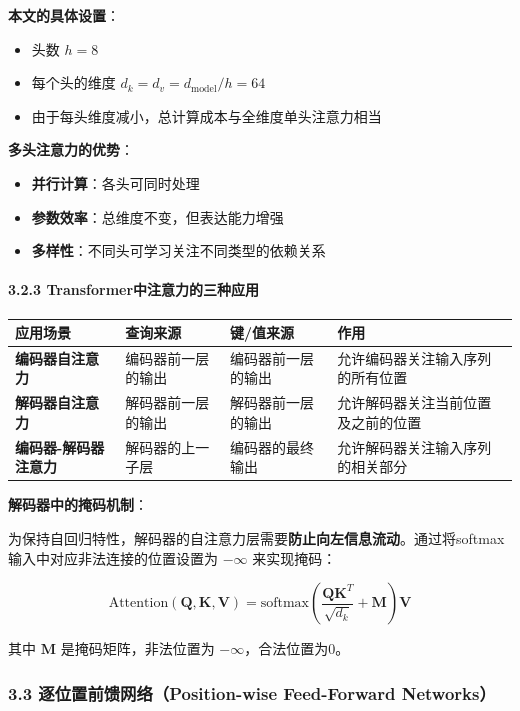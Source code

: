 \documentclass[11pt,a4paper]{article}
\begin{document}
\textbf{本文的具体设置}：
\begin{itemize}
  \item 头数 $h = 8$
  \item 每个头的维度 $d_k = d_v = d_{\text{model}}/h = 64$
  \item 由于每头维度减小，总计算成本与全维度单头注意力相当
\end{itemize}

\textbf{多头注意力的优势}：
\begin{itemize}
  \item \textbf{并行计算}：各头可同时处理
  \item \textbf{参数效率}：总维度不变，但表达能力增强
  \item \textbf{多样性}：不同头可学习关注不同类型的依赖关系
\end{itemize}

\paragraph{3.2.3 Transformer中注意力的三种应用}

\begin{center}
\begin{tabular}{|l|l|l|l|}
\hline
应用场景 & 查询来源 & 键/值来源 & 作用 \\
\hline
\textbf{编码器自注意力} & 编码器前一层的输出 & 编码器前一层的输出 & 允许编码器关注输入序列的所有位置 \\
\hline
\textbf{解码器自注意力} & 解码器前一层的输出 & 解码器前一层的输出 & 允许解码器关注当前位置及之前的位置 \\
\hline
\textbf{编码器-解码器注意力} & 解码器的上一子层 & 编码器的最终输出 & 允许解码器关注输入序列的相关部分 \\
\hline
\end{tabular}
\end{center}

\textbf{解码器中的掩码机制}：

为保持自回归特性，解码器的自注意力层需要\textbf{防止向左信息流动}。通过将softmax输入中对应非法连接的位置设置为 $-\infty$ 来实现掩码：

\[
\text{Attention}(\mathbf{Q}, \mathbf{K}, \mathbf{V}) = \text{softmax}\left(\frac{\mathbf{Q}\mathbf{K}^T}{\sqrt{d_k}} + \mathbf{M}\right)\mathbf{V}
\]

其中 $\mathbf{M}$ 是掩码矩阵，非法位置为 $-\infty$，合法位置为0。

\subsubsection*{3.3 逐位置前馈网络（Position-wise Feed-Forward Networks）}
\end{document}
